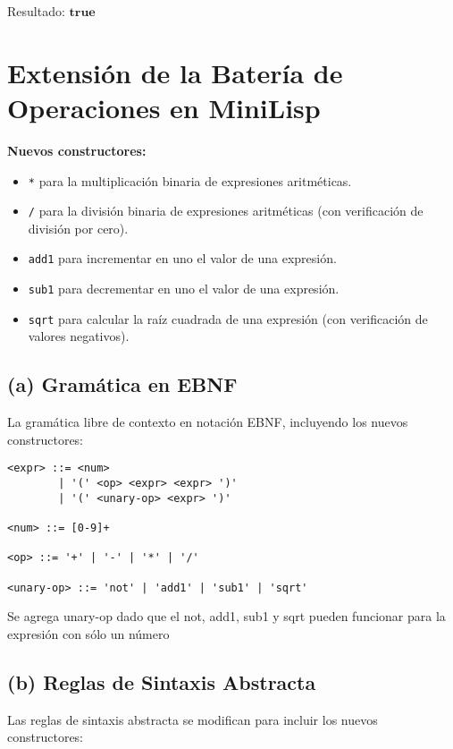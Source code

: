 \documentclass[12pt,letterpaper]{article}
\begin{document}
Resultado: \(\mathbf{true}\)

\section*{Extensión de la Batería de Operaciones en MiniLisp}

\textbf{Nuevos constructores:}
\begin{itemize}
    \item \texttt{*} para la multiplicación binaria de expresiones aritméticas.
    \item \texttt{/} para la división binaria de expresiones aritméticas (con verificación de división por cero).
    \item \texttt{add1} para incrementar en uno el valor de una expresión.
    \item \texttt{sub1} para decrementar en uno el valor de una expresión.
    \item \texttt{sqrt} para calcular la raíz cuadrada de una expresión (con verificación de valores negativos).
\end{itemize}

\subsection*{(a) Gramática en EBNF}

La gramática libre de contexto en notación EBNF, incluyendo los nuevos constructores:

\begin{verbatim}
<expr> ::= <num>
        | '(' <op> <expr> <expr> ')'
        | '(' <unary-op> <expr> ')'

<num> ::= [0-9]+

<op> ::= '+' | '-' | '*' | '/' 

<unary-op> ::= 'not' | 'add1' | 'sub1' | 'sqrt'
\end{verbatim}

Se agrega unary-op dado que el not, add1, sub1 y sqrt pueden funcionar para la expresión con sólo un número

\subsection*{(b) Reglas de Sintaxis Abstracta}

Las reglas de sintaxis abstracta se modifican para incluir los nuevos constructores:
\end{document}
